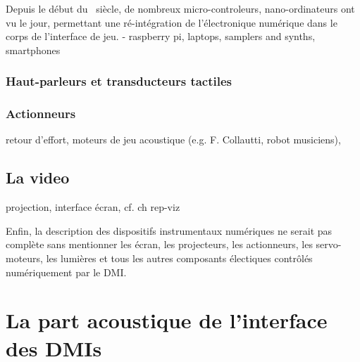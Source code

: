 Depuis le début du ~siècle, de nombreux micro-controleurs, nano-ordinateurs ont vu le jour, permettant une ré-intégration de l'électronique numérique dans le corps de l'interface de jeu.
- raspberry pi, laptops, samplers and synths, smartphones


\subsubsection{Haut-parleurs et transducteurs tactiles}

\subsubsection{Actionneurs}
retour d'effort, moteurs de jeu acoustique (e.g. F. Collautti, robot musiciens), 

\subsection{La video}
projection, interface écran, cf. ch rep-viz

\noident Enfin, la description des dispositifs instrumentaux numériques ne serait pas complète sans mentionner les écran, les projecteurs, les actionneurs, les servo-moteurs, les lumières et tous les autres composants électiques contrôlés numériquement par le \gls{DMI}.


\section{La part acoustique de l'interface des DMIs}
\label{sec:interfaces:part_acoustique}

